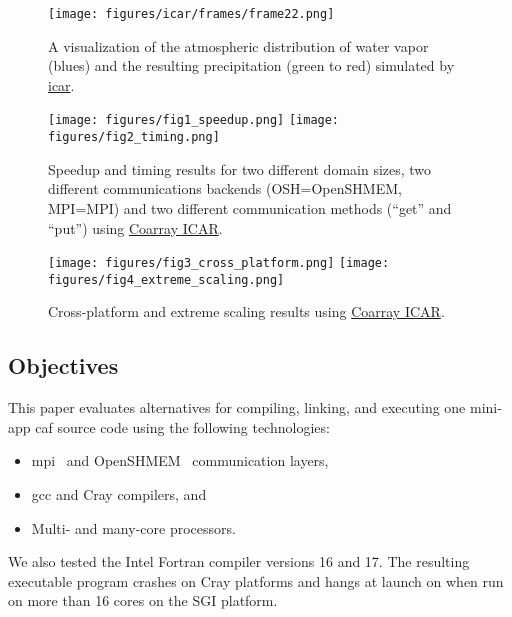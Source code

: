 \begin{figure}
   \vspace{-18pt}
   \vbox{\hspace{-24pt}
   \texttt{[image: figures/icar/frames/frame22.png]}
   }
   \vspace{-24pt}
   \caption{A visualization of the atmospheric distribution of water vapor (blues) and the resulting precipitation (green to red) simulated by \href{https://github.com/gutmann/icar}{\gls{icar}}.%
\label{figure:icar}}
\end{figure}

\begin{figure*}
  \texttt{[image: figures/fig1\_speedup.png]}
  \texttt{[image: figures/fig2\_timing.png]}
  \caption{Speedup and timing results for two different domain sizes, two different communications backends (OSH=OpenSHMEM, MPI=MPI) and two different communication methods (``get'' and ``put'') using \href{https://github.com/gutmann/coarray_icar}{Coarray ICAR}.\label{fig1-2}}
\end{figure*}

\begin{figure*}
  \texttt{[image: figures/fig3\_cross\_platform.png]}
  \vspace{-6pt}
  \texttt{[image: figures/fig4\_extreme\_scaling.png]}
   \caption{Cross-platform and extreme scaling results using \href{https://github.com/gutmann/coarray_icar}{Coarray ICAR}.\label{fig3-4}}
   \vspace{-6pt}
\end{figure*}

\subsection{Objectives}
This paper evaluates alternatives for compiling, linking, and executing one
\gls{mini-app} \gls{caf} source code using the following technologies:
\begin{itemize}
  \item \gls{mpi}~\cite{mpiforum2016mpi} and OpenSHMEM~\cite{openshmem2016} communication layers,
  \item \gls{gcc} and Cray compilers, and
  \item Multi- and many-core processors.
\end{itemize}
We also tested the Intel Fortran compiler versions 16 and 17. The resulting executable
program crashes on Cray platforms and hangs at launch on when run on more than 16 cores on the SGI platform.

